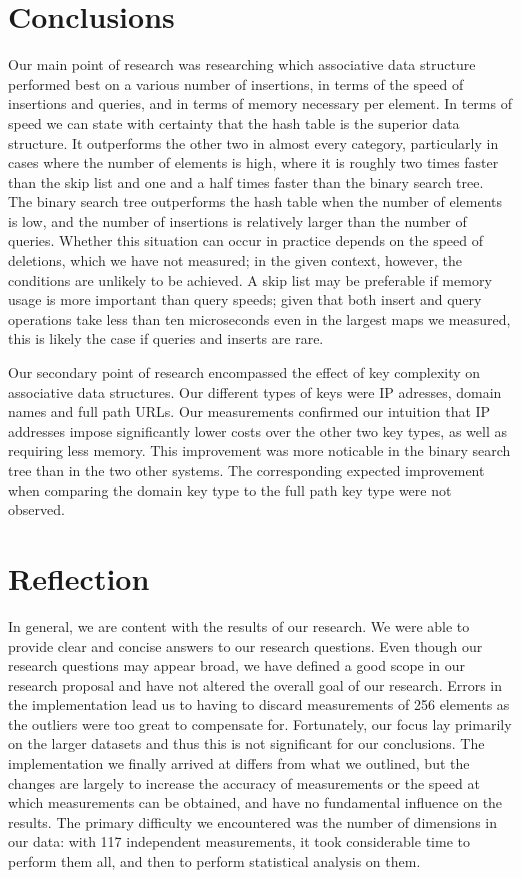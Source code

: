 \documentclass[12pt,a4paper]{article}
\begin{document}
    \section{Conclusions}
    Our main point of research was researching which associative data structure performed best on a
    various number of insertions, in terms of the speed of insertions and queries, and in terms of
    memory necessary per element.  In terms of speed we can state with certainty that the hash table
    is the superior data structure.  It outperforms the other two in almost every category,
    particularly in cases where the number of elements is high, where it is roughly two times faster
    than the skip list and one and a half times faster than the binary search tree.  The binary
    search tree outperforms the hash table when the number of elements is low, and the number of
    insertions is relatively larger than the number of queries.  Whether this situation can occur in
    practice depends on the speed of deletions, which we have not measured; in the given context,
    however, the conditions are unlikely to be achieved.  A skip list may be preferable if memory
    usage is more important than query speeds; given that both insert and query operations take less
    than ten microseconds even in the largest maps we measured, this is likely the case if queries
    and inserts are rare.

    Our secondary point of research encompassed the effect of key complexity on associative data
    structures.  Our different types of keys were IP adresses, domain names and full path URLs.  Our
    measurements confirmed our intuition that IP addresses impose significantly lower costs over the
    other two key types, as well as requiring less memory.  This improvement was more noticable in
    the binary search tree than in the two other systems.  The corresponding expected improvement
    when comparing the domain key type to the full path key type were not observed.


    \section{Reflection}
    In general, we are content with the results of our research. We were able to provide clear and
    concise answers to our research questions. Even though our research questions may appear broad,
    we have defined a good scope in our research proposal and have not altered the overall goal
    of our research.  Errors in the implementation lead us to having to discard measurements of 256
    elements as the outliers were too great to compensate for.  Fortunately, our focus lay primarily
    on the larger datasets and thus this is not significant for our conclusions.  The implementation
    we finally arrived at differs from what we outlined, but the changes are largely to increase the
    accuracy of measurements or the speed at which measurements can be obtained, and have no
    fundamental influence on the results.  The primary difficulty we encountered was the number of
    dimensions in our data: with 117 independent measurements, it took considerable time to perform
    them all, and then to perform statistical analysis on them.
\end{document}
